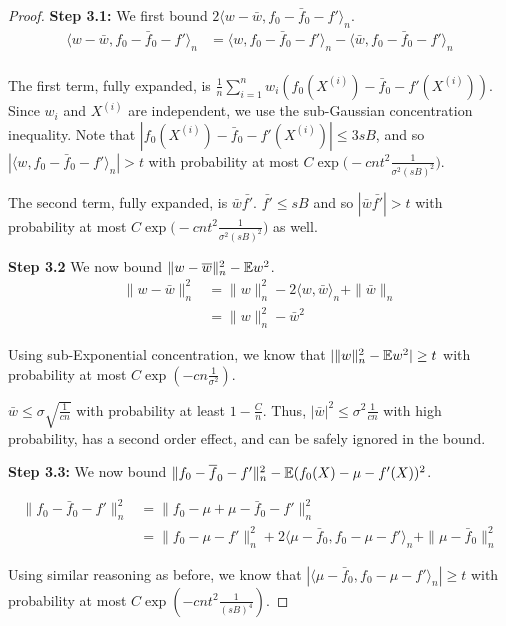 \begin{proof}
\textbf{Step 3.1:} We first bound $2 \langle w - \bar{w}, f_0 - \bar{f}_0 - f'\rangle_n$.
\begin{align*}
\langle w - \bar{w}, f_0 - \bar{f}_0 - f'\rangle_n &=
      \langle w, f_0 - \bar{f}_0 - f'\rangle_n 
      - \langle \bar{w}, f_0 - \bar{f}_0 - f'\rangle_n \\
\end{align*}

The first term, fully expanded, is $\frac{1}{n} \sum_{i=1}^n w_i (f_0(X^{(i)}) - \bar{f}_0 - f'(X^{(i)}))$. Since $w_i$ and $X^{(i)}$ are independent, we use the sub-Gaussian concentration inequality. Note that $|f_0(X^{(i)}) - \bar{f}_0 - f'(X^{(i)})| \leq 3sB$, and so $|\langle w, f_0 - \bar{f}_0 - f' \rangle_n | > t$ with probability at most $C \exp\big( - c n t^2 \frac{1}{\sigma^2 (sB)^2} \big)$.

The second term, fully expanded, is $\bar{w} \bar{f'}$. $\bar{f'} \leq sB$ and so $|\bar{w}\bar{f'}| > t$ with probability at most $C \exp\big( - c n t^2 \frac{1}{\sigma^2(sB)^2} \big)$ as well.

\textbf{Step 3.2} We now bound $\| w - \overline{w} \|_n^2 - {\mathbb E} w^2$. 
\begin{align*}
\|w - \bar{w} \|_n^2 &= \|w\|_n^2 - 2 \langle w, \bar{w} \rangle_n + \|\bar{w}\|_n \\
               &= \|w\|_n^2 - \bar{w}^2
\end{align*}

Using sub-Exponential concentration, we know that $| \|w\|_n^2 - {\mathbb E} w^2 | \geq t$ with probability at most $C \exp( - c n \frac{1}{\sigma^2})$. 

$\bar{w} \leq \sigma\sqrt{\frac{1}{cn}}$ with probability at least $1-\frac{C}{n}$. Thus, $| \bar{w}|^2 \leq \sigma^2 \frac{1}{cn}$ with high probability, has a second order effect, and can be safely ignored in the bound.

\textbf{Step 3.3:} We now bound $\| f_0 - \overline{f}_0 - f'\|_n^2 - {\mathbb E}(f_0(X) - \mu - f'(X))^2$.

\begin{align*}
\| f_0 - \bar{f}_0 - f'\|_n^2 &= \|f_0 -\mu+\mu - \bar{f}_0 - f'\|_n^2 \\
      &= \| f_0 - \mu - f'\|_n^2 + 2 \langle \mu-\bar{f}_0, f_0 - \mu - f'\rangle_n 
          + \|\mu - \bar{f}_0 \|_n^2 
\end{align*}

Using similar reasoning as before, we know that $| \langle \mu-\bar{f}_0, f_0 - \mu - f'\rangle_n | \geq t $ with probability at most $C \exp( - c n t^2 \frac{1}{(sB)^4})$. 


\end{proof}
